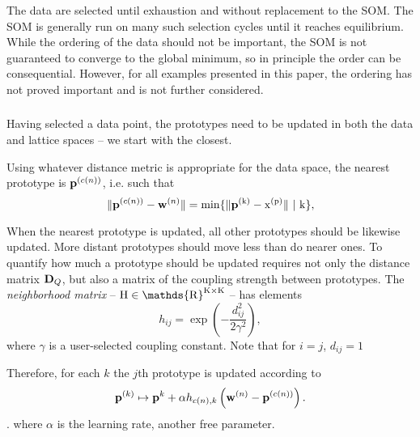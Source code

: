 \documentclass[fleqn,usenatbib]{mnras}
\begin{document}
      \subsubsection*{}

        The data are selected until exhaustion and without replacement to the
        SOM. The SOM is generally run on many such selection cycles until it
        reaches equilibrium. While the ordering of the data should not be
        important, the SOM is not guaranteed to converge to the global minimum,
        so in principle the order can be consequential. However, for all
        examples presented in this paper, the ordering has not proved important
        and is not further considered.


      \subsubsection*{}

        Having selected a data point, the prototypes need to be updated in both
        the data and lattice spaces -- we start with the closest.

        Using whatever distance metric is appropriate for the data space, the
        nearest prototype is $\mathbf{p}^{(c(n))}$, i.e. such that
        \begin{equation} \label{eq:app:som_BMU}
            \lVert \mathbf{p}^{(c(n))} - \mathbf{w}^{(n)} \rVert = \rm{min}\{\lVert \mathbf{p}^{(k)} - x^{(p)} \rVert \ | \ k \},
        \end{equation}

        When the nearest prototype is updated, all other prototypes should be
        likewise updated. More distant prototypes should move less than do
        nearer ones. To quantify how much a prototype should be updated requires
        not only the distance matrix $\mathbf{D}_Q$, but also a matrix of the
        coupling strength between prototypes. The \textit{neighborhood matrix}
        -- $\rm{H} \in \mathds{R}^{K \times K}$ -- has elements
        \begin{equation}
            h_{ij} = \exp\left(-\frac{d_{ij}^2}{2\gamma^2}\right),
        \end{equation}
        where $\gamma$ is a user-selected coupling constant. Note that for
        $i=j$, $d_{ij}=1$

        Therefore, for each $k$ the $j$th prototype is updated according to 
        \begin{equation} \label{eq:app:som_update_prototype}
            \mathbf{p}^{(k)} \mapsto \mathbf{p}^{k} + \alpha h_{c(n), k} \left(\mathbf{w}^{(n)} - \mathbf{p}^{(c(n))}\right).
        \end{equation}.
        where $\alpha$ is the learning rate, another free parameter.
\end{document}
